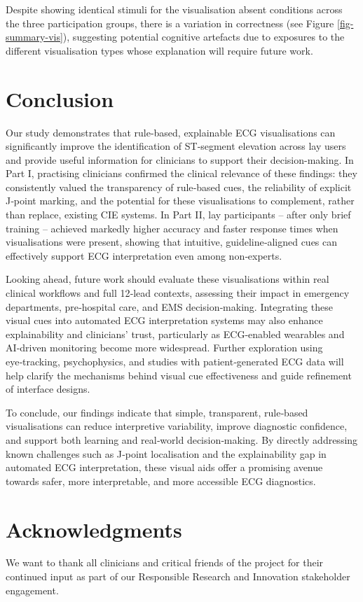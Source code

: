 \documentclass[
  10pt,
  letterpaper,
]{article}
\begin{document}
Despite showing identical stimuli for the visualisation absent
conditions across the three participation groups, there is a variation
in correctness (see Figure \ref{fig-summary-vis}), suggesting potential
cognitive artefacts due to exposures to the different visualisation
types \cite{pugh_2018} whose explanation will require future work.

\section{Conclusion}\label{conclusion}

Our study demonstrates that rule‑based, explainable ECG visualisations
can significantly improve the identification of ST‑segment elevation
across lay users and provide useful information for clinicians to
support their decision-making. In Part I, practising clinicians
confirmed the clinical relevance of these findings: they consistently
valued the transparency of rule‑based cues, the reliability of explicit
J‑point marking, and the potential for these visualisations to
complement, rather than replace, existing CIE systems. In Part II, lay
participants -- after only brief training -- achieved markedly higher
accuracy and faster response times when visualisations were present,
showing that intuitive, guideline‑aligned cues can effectively support
ECG interpretation even among non‑experts.

Looking ahead, future work should evaluate these visualisations within
real clinical workflows and full 12‑lead contexts, assessing their
impact in emergency departments, pre‑hospital care, and EMS
decision‑making. Integrating these visual cues into automated ECG
interpretation systems may also enhance explainability and clinicians'
trust, particularly as ECG‑enabled wearables and AI‑driven monitoring
become more widespread. Further exploration using eye‑tracking,
psychophysics, and studies with patient‑generated ECG data will help
clarify the mechanisms behind visual cue effectiveness and guide
refinement of interface designs.

To conclude, our findings indicate that simple, transparent, rule‑based
visualisations can reduce interpretive variability, improve diagnostic
confidence, and support both learning and real‑world decision‑making. By
directly addressing known challenges such as J‑point localisation and
the explainability gap in automated ECG interpretation, these visual
aids offer a promising avenue towards safer, more interpretable, and
more accessible ECG diagnostics.

\section*{Acknowledgments}\label{acknowledgments}

We want to thank all clinicians and critical friends of the project for
their continued input as part of our Responsible Research and Innovation
stakeholder engagement.


\nolinenumbers
\renewcommand\refname{References}
  
\end{document}
